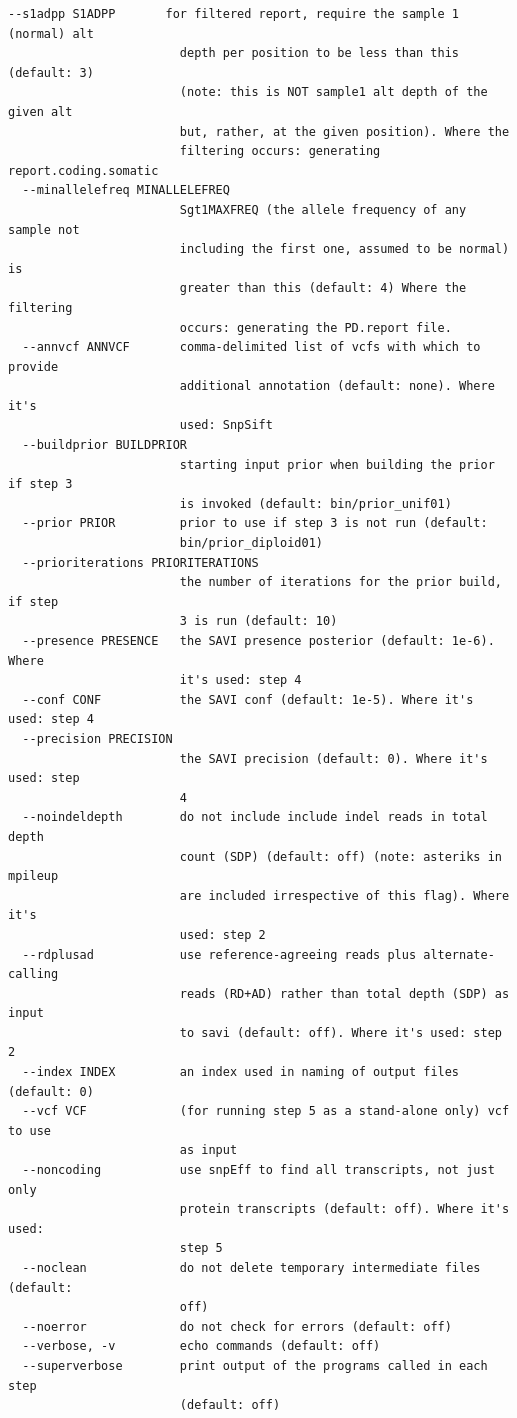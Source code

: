 \documentclass[letterpaper,14pt]{memoir}
\begin{document}
\begin{Verbatim}[fontsize=\small]
  --s1adpp S1ADPP       for filtered report, require the sample 1 (normal) alt
                        depth per position to be less than this (default: 3)
                        (note: this is NOT sample1 alt depth of the given alt
                        but, rather, at the given position). Where the
                        filtering occurs: generating report.coding.somatic
  --minallelefreq MINALLELEFREQ
                        Sgt1MAXFREQ (the allele frequency of any sample not
                        including the first one, assumed to be normal) is
                        greater than this (default: 4) Where the filtering
                        occurs: generating the PD.report file.
  --annvcf ANNVCF       comma-delimited list of vcfs with which to provide
                        additional annotation (default: none). Where it's
                        used: SnpSift
  --buildprior BUILDPRIOR
                        starting input prior when building the prior if step 3
                        is invoked (default: bin/prior_unif01)
  --prior PRIOR         prior to use if step 3 is not run (default:
                        bin/prior_diploid01)
  --prioriterations PRIORITERATIONS
                        the number of iterations for the prior build, if step
                        3 is run (default: 10)
  --presence PRESENCE   the SAVI presence posterior (default: 1e-6). Where
                        it's used: step 4
  --conf CONF           the SAVI conf (default: 1e-5). Where it's used: step 4
  --precision PRECISION
                        the SAVI precision (default: 0). Where it's used: step
                        4
  --noindeldepth        do not include include indel reads in total depth
                        count (SDP) (default: off) (note: asteriks in mpileup
                        are included irrespective of this flag). Where it's
                        used: step 2
  --rdplusad            use reference-agreeing reads plus alternate-calling
                        reads (RD+AD) rather than total depth (SDP) as input
                        to savi (default: off). Where it's used: step 2
  --index INDEX         an index used in naming of output files (default: 0)
  --vcf VCF             (for running step 5 as a stand-alone only) vcf to use
                        as input
  --noncoding           use snpEff to find all transcripts, not just only
                        protein transcripts (default: off). Where it's used:
                        step 5
  --noclean             do not delete temporary intermediate files (default:
                        off)
  --noerror             do not check for errors (default: off)
  --verbose, -v         echo commands (default: off)
  --superverbose        print output of the programs called in each step
                        (default: off)
\end{Verbatim}
\end{document}
